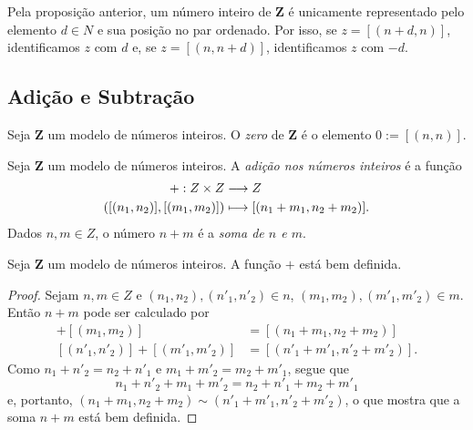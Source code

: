 	Pela proposição anterior, um número inteiro de $\bm Z$ é unicamente representado pelo elemento $d \in N$ e sua posição no par ordenado. Por isso, se $z=[(n+d,n)]$, identificamos $z$ com $d$ e, se $z=[(n,n+d)]$, identificamos $z$ com $-d$.


\subsection{Adição e Subtração}

\begin{defi}
Seja $\bm Z$ um modelo de números inteiros. O \emph{zero} de $\bm Z$ é o elemento $0 := [(n,n)]$.
\end{defi}

\begin{defi}
Seja $\bm Z$ um modelo de números inteiros. A \emph{adição nos números inteiros} é a função
	\begin{align*}
	{+}: {Z \times Z} &\longrightarrow {Z} \\{([(n_1,n_2)],[(m_1,m_2)])} &\longmapsto {[(n_1+m_1,n_2+m_2)]}.
	\end{align*}
Dados $n,m \in Z$, o número $n+m$ é a \emph{soma de $n$ e $m$}.
\end{defi}

\begin{teo}
	Seja $\bm Z$ um modelo de números inteiros. A função $+$ está bem definida.
\end{teo}
\begin{proof}
	Sejam $n,m \in Z$ e $(n_1,n_2),(n'_1,n'_2) \in n$, $(m_1,m_2),(m'_1,m'_2) \in m$. Então $n+m$ pode ser calculado por
	\begin{align*}
	[(n_1,n_2)]+[(m_1,m_2)] &= [(n_1+m_1,n_2+m_2)] \\
	[(n'_1,n'_2)]+[(m'_1,m'_2)] &= [(n'_1+m'_1,n'_2+m'_2)].
	\end{align*}
Como $n_1+n'_2=n_2+n'_1$ e $m_1+m'_2=m_2+m'_1$, segue que
	\begin{equation*}
	n_1+n'_2+m_1+m'_2=n_2+n'_1+m_2+m'_1
	\end{equation*}
e, portanto, $(n_1+m_1,n_2+m_2) \sim (n'_1+m'_1,n'_2+m'_2)$, o que mostra que a soma $n+m$ está bem definida.
\end{proof}


